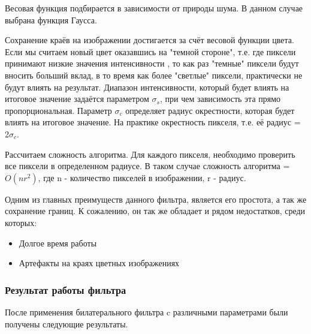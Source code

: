 Весовая функция подбирается в зависимости от природы шума. В данном случае выбрана функция Гаусса.

Сохранение краёв на изображении достигается за счёт весовой функции цвета. Если мы считаем новый цвет оказавшись на "темной стороне", т.е. где пиксели принимают низкие значения интенсивности , то как раз "темные" пиксели будут вносить больший вклад, в то время как более "светлые" пиксели, практически не будут влиять на результат. Диапазон интенсивности, который будет влиять на итоговое значение задаётся параметром $\sigma_s$,  при чем зависимость эта прямо пропорциональная.
Параметр $\sigma_c$ определяет радиус окрестности, которая будет влиять на итоговое значение. На практике окрестность пикселя, т.е. её радиус = 2$\sigma_c$.

Рассчитаем сложность алгоритма. Для каждого пикселя, необходимо проверить все пиксели в определенном радиусе. В таком случае сложность алгоритма = $O(nr^2)$, где n - количество пикселей в изображении, r - радиус. 

Одним из главных преимуществ данного фильтра, является его простота, а так же сохранение границ. К сожалению, он так же обладает и рядом недостатков, среди которых:

\begin{itemize}
	\item Долгое время работы
	\item Артефакты на краях цветных изображениях
\end{itemize}

\subsubsection{Результат работы фильтра}
После применения билатерального фильтра c различными параметрами были получены следующие результаты.



